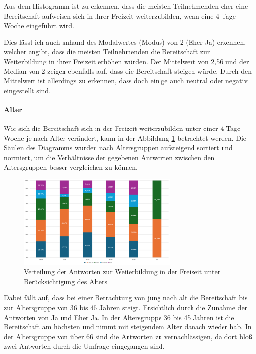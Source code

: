 Aus dem Histogramm ist zu erkennen, dass die meisten Teilnehmenden eher 
eine Bereitschaft aufweisen sich in ihrer Freizeit weiterzubilden, 
wenn eine 4-Tage-Woche eingeführt wird.

Dies lässt ich auch anhand des Modalwertes (Modus) von 2 (Eher Ja) erkennen, welcher angibt, dass die
meisten Teilnehmenden die Bereitschaft zur Weiterbildung in ihrer Freizeit erhöhen würden.
Der Mittelwert von 2,56 und der Median von 2 zeigen ebenfalls auf, dass die Bereitschaft steigen würde.
Durch den Mittelwert ist allerdings zu erkennen, dass doch einige auch neutral oder negativ 
eingestellt sind.

\paragraph*{Alter}

Wie sich die Bereitschaft sich in der Freizeit weiterzubilden unter einer 4-Tage-Woche je nach Alter verändert,
kann in der Abbildung \ref{fig:bereitschaft_weiterbildung_alter} betrachtet werden. 
Die Säulen des Diagramms wurden nach Altersgruppen aufsteigend sortiert und normiert, um die Verhältnisse
der gegebenen Antworten zwischen den Altersgruppen besser vergleichen zu können.

\begin{figure}
    \centering
    \includegraphics[width=0.7\textwidth]{04_Artefakte/01_Abbildungen/hypothese_9/weiterbildung_alter.png}
    \caption{Verteilung der Antworten zur Weiterbildung in der Freizeit unter Berücksichtigung des Alters}
    \label{fig:bereitschaft_weiterbildung_alter}
\end{figure}

Dabei fällt auf, dass bei einer Betrachtung von jung nach alt die Bereitschaft bis zur Altersgruppe von
36 bis 45 Jahren steigt. Ersichtlich durch die Zunahme der Antworten von Ja und Eher Ja.
In der Altersgruppe 36 bis 45 Jahren ist die Bereitschaft am höchsten und nimmt mit steigendem Alter danach
wieder hab. In der Altersgruppe von über 66 sind die Antworten zu vernachlässigen, da dort bloß
zwei Antworten durch die Umfrage eingegangen sind.

